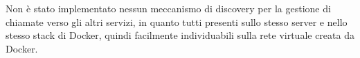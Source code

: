 Non è stato implementato nessun meccanismo di discovery per la gestione di chiamate verso gli altri servizi, in quanto tutti presenti sullo stesso server e nello stesso stack di Docker, quindi facilmente individuabili sulla rete virtuale creata da Docker.


